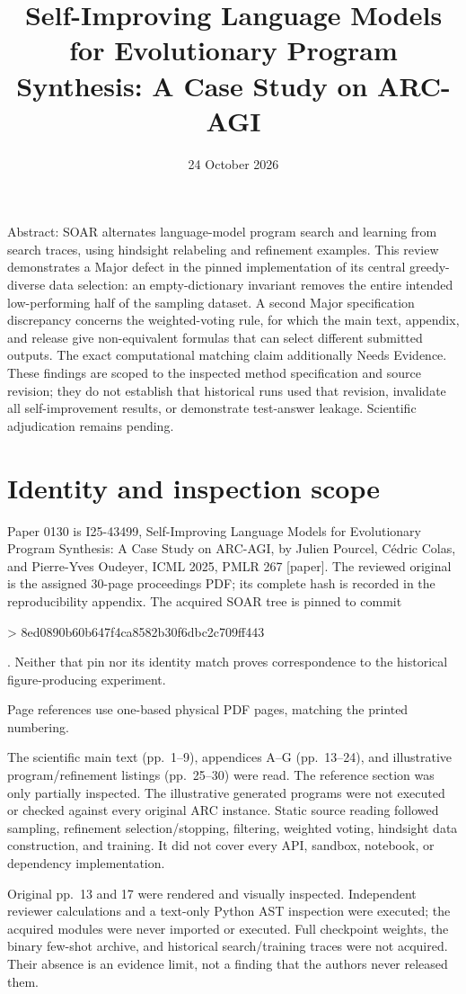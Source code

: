 \documentclass[10pt]{article}
\title{Self-Improving Language Models for Evolutionary Program Synthesis: A Case Study on ARC-AGI}
\author{}
\date{24 October 2026}
\begin{document}
\maketitle
Abstract: SOAR alternates language-model program search and learning from search traces, using hindsight relabeling and refinement examples. This review demonstrates a Major defect in the pinned implementation of its central greedy-diverse data selection: an empty-dictionary invariant removes the entire intended low-performing half of the sampling dataset. A second Major specification discrepancy concerns the weighted-voting rule, for which the main text, appendix, and release give non-equivalent formulas that can select different submitted outputs. The exact computational matching claim additionally Needs Evidence. These findings are scoped to the inspected method specification and source revision; they do not establish that historical runs used that revision, invalidate all self-improvement results, or demonstrate test-answer leakage. Scientific adjudication remains pending.\par
\section*{Identity and inspection scope}
Paper 0130 is I25-43499, Self-Improving Language Models for Evolutionary Program Synthesis: A Case Study on ARC-AGI, by Julien Pourcel, Cédric Colas, and Pierre-Yves Oudeyer, ICML 2025, PMLR 267 [paper]. The reviewed original is the assigned 30-page proceedings PDF; its complete hash is recorded in the reproducibility appendix. The acquired SOAR tree is pinned to commit\par
> 8ed0890b60b647f4ca8582b30f6dbc2c709ff443\par
[code]. Neither that pin nor its identity match proves correspondence to the historical figure-producing experiment.\par
Page references use one-based physical PDF pages, matching the printed numbering.\par
The scientific main text (pp. 1–9), appendices A–G (pp. 13–24), and illustrative program/refinement listings (pp. 25–30) were read. The reference section was only partially inspected. The illustrative generated programs were not executed or checked against every original ARC instance. Static source reading followed sampling, refinement selection/stopping, filtering, weighted voting, hindsight data construction, and training. It did not cover every API, sandbox, notebook, or dependency implementation.\par
Original pp. 13 and 17 were rendered and visually inspected. Independent reviewer calculations and a text-only Python AST inspection were executed; the acquired modules were never imported or executed. Full checkpoint weights, the binary few-shot archive, and historical search/training traces were not acquired. Their absence is an evidence limit, not a finding that the authors never released them.\par
\end{document}
